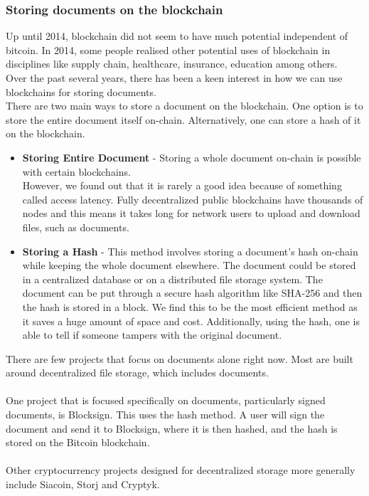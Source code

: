 \subsubsection{Storing documents on the blockchain}
Up until 2014, blockchain did not seem to have much potential independent of bitcoin. In 2014, some people realised other potential uses of blockchain in disciplines like supply chain, healthcare, insurance, education among others.\\
Over the past several years, there has been a keen interest in how we can use blockchains for storing documents.\\
There are two main ways to store a document on the blockchain. One option is to store the entire document itself on-chain. Alternatively, one can store a hash of it on the blockchain.
\begin{itemize}
\item \textbf{Storing Entire Document} - Storing a whole document on-chain is possible with certain blockchains.\\
However, we found out that it is rarely a good idea because of something called access latency. Fully decentralized public blockchains have thousands of nodes and this means it takes long for network users to upload and download files, such as documents. 
\item \textbf{Storing a Hash} - This method involves storing a document’s hash on-chain while keeping the whole document elsewhere. The document could be stored in a centralized database or on a distributed file storage system. The document can be put through a secure hash algorithm like SHA-256 and then the hash is stored in a block. We find this to be the most efficient method as it saves a huge amount of space and cost. Additionally, using the hash, one is able to tell if someone tampers with the original document.
\end{itemize}
There are few projects that focus on documents alone right now. Most are built around decentralized file storage, which includes documents.\\\\
One project that is focused specifically on documents, particularly signed documents, is Blocksign\cite{art6}. This uses the hash method. A user will sign the document and send it to Blocksign, where it is then hashed, and the hash is stored on the Bitcoin blockchain.\\\\
Other cryptocurrency projects designed for decentralized storage more generally include Siacoin, Storj and Cryptyk.\\\\
